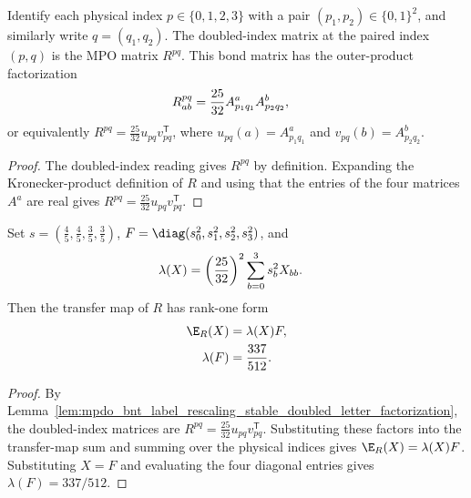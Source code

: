 \begin{lemma}
    \label{lem:mpdo_bnt_label_rescaling_stable_doubled_letter_factorization}
    \leanok
    Identify each physical index $p\in\{0,1,2,3\}$ with a pair
    $(p_1,p_2)\in\{0,1\}^2$, and similarly write $q=(q_1,q_2)$. The
    doubled-index matrix at the paired index $(p,q)$ is the MPO matrix $R^{pq}$.
    This bond matrix has the outer-product factorization
    \begin{align}
        R^{pq}_{ab}
         & =\frac{25}{32}A^a_{p_1q_1}A^b_{p_2q_2},
        \notag
    \end{align}
    or equivalently $R^{pq}=\frac{25}{32}u_{pq}v_{pq}^{\mathsf T}$, where
    $u_{pq}(a)=A^a_{p_1q_1}$ and $v_{pq}(b)=A^b_{p_2q_2}$.
\end{lemma}

\begin{proof}\leanok
    The doubled-index reading gives $R^{pq}$ by definition. Expanding the
    Kronecker-product definition of $R$ and using that the entries of the
    four matrices $A^a$ are real gives
    $R^{pq}=\frac{25}{32}u_{pq}v_{pq}^{\mathsf T}$.
\end{proof}

\begin{lemma}
    \label{lem:mpdo_bnt_label_rescaling_stable_transfer_rank_one}
    \leanok
    Set $s=(\frac45,\frac45,\frac35,\frac35)$,
    $F=\diag(s_0^2,s_1^2,s_2^2,s_3^2)$, and
    \begin{align}
        \lambda(X) & =\left(\frac{25}{32}\right)^2
        \sum_{b=0}^3s_b^2X_{bb}.
        \notag
    \end{align}
    Then the transfer map of $R$ has rank-one form
    \begin{align}
        \E_R(X)    & =\lambda(X)F,
        \notag                         \\
        \lambda(F) & =\frac{337}{512}.
        \notag
    \end{align}
\end{lemma}

\begin{proof}\leanok
    By
    Lemma~\ref{lem:mpdo_bnt_label_rescaling_stable_doubled_letter_factorization},
    the doubled-index matrices are
    $R^{pq}=\frac{25}{32}u_{pq}v_{pq}^{\mathsf T}$.
    Substituting these factors into the transfer-map sum and summing over
    the physical indices gives $\E_R(X)=\lambda(X)F$.
    Substituting $X=F$ and evaluating the four diagonal entries gives
    $\lambda(F)=337/512$.
\end{proof}

